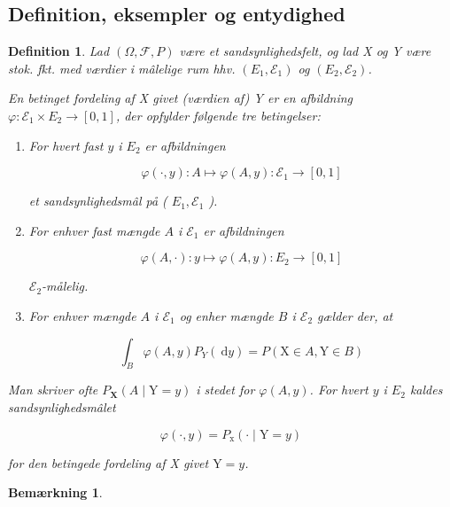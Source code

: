 \documentclass{article}
\newcommand{\1}{\mathbbm{1}}
\theoremstyle{boxed}
\newtheorem{definition}[theorem]{Definition}
\newtheorem{remark}[theorem]{Bemærkning}
\begin{document}
\subsection{Definition, eksempler og entydighed}
\begin{theorem-box}
    \begin{definition}
        Lad $(\Omega, \mathcal{F}, P)$ være et sandsynlighedsfelt, og lad X og Y være stok. fkt. med værdier i mâlelige rum hhv. $\left(E_1, \mathcal{E}_1\right)$ og $\left(E_2, \mathcal{E}_2\right)$.

En betinget fordeling af X givet (værdien af) Y er en afbildning $\varphi: \mathcal{E}_1 \times E_2 \rightarrow[0,1]$, der opfylder følgende tre betingelser:
\begin{enumerate}
    \item For hvert fast $y$ i $E_2$ er afbildningen

$$
\varphi(\cdot, y): A \mapsto \varphi(A, y): \mathcal{E}_1 \rightarrow[0,1]
$$

et sandsynlighedsmâl på ( $E_1, \mathcal{E}_1$ ).
\item For enhver fast mængde $A$ i $\mathcal{E}_1$ er afbildningen

$$
\varphi(A, \cdot): y \mapsto \varphi(A, y): E_2 \rightarrow[0,1]
$$

$\mathcal{E}_2$-målelig.
\item For enhver mængde $A$ i $\mathcal{E}_1$ og enher mængde $B$ i $\mathcal{E}_2$ gælder der, at

$$
\int_B \varphi(A, y) P_Y(\mathrm{~d} y)=P(\mathrm{X} \in A, \mathrm{Y} \in B)
$$

\end{enumerate}
Man skriver ofte $P_{\mathbf{X}}(A \mid \mathrm{Y}=y)$ i stedet for $\varphi(A, y)$.
For hvert $y$ i $E_2$ kaldes sandsynlighedsmâlet

$$
\varphi(\cdot, y)=P_{\mathrm{x}}(\cdot \mid \mathrm{Y}=y)
$$

for den betingede fordeling af X givet $\mathrm{Y}=y$.
    \end{definition}
\end{theorem-box}
\begin{remark}\end{remark}
\end{document}
